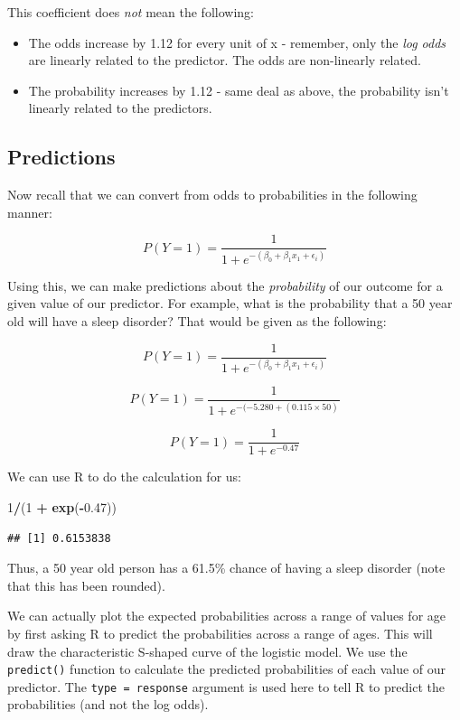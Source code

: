 \documentclass[
]{book}
\newenvironment{Shaded}{\begin{snugshade}}{\end{snugshade}}
\newcommand{\DecValTok}[1]{\textcolor[rgb]{0.00,0.00,0.81}{#1}}
\newcommand{\FloatTok}[1]{\textcolor[rgb]{0.00,0.00,0.81}{#1}}
\newcommand{\FunctionTok}[1]{\textcolor[rgb]{0.13,0.29,0.53}{\textbf{#1}}}
\newcommand{\NormalTok}[1]{#1}
\newcommand{\SpecialCharTok}[1]{\textcolor[rgb]{0.81,0.36,0.00}{\textbf{#1}}}
\providecommand{\tightlist}{%
  \setlength{\itemsep}{0pt}\setlength{\parskip}{0pt}}
\begin{document}
This coefficient does \emph{not} mean the following:

\begin{itemize}
\tightlist
\item
  The odds increase by 1.12 for every unit of x - remember, only the \emph{log odds} are linearly related to the predictor. The odds are non-linearly related.
\item
  The probability increases by 1.12 - same deal as above, the probability isn't linearly related to the predictors.
\end{itemize}

\hypertarget{predictions-1}{%
\subsection{Predictions}\label{predictions-1}}

Now recall that we can convert from odds to probabilities in the following manner:

\[
P(Y = 1) = \frac{1}{1 + e^{-(\beta_0 + \beta_1 x_1 + \epsilon_i)}} 
\]

Using this, we can make predictions about the \emph{probability} of our outcome for a given value of our predictor. For example, what is the probability that a 50 year old will have a sleep disorder? That would be given as the following:

\[
P(Y = 1) = \frac{1}{1 + e^{-(\beta_0 + \beta_1 x_1 + \epsilon_i)}} 
\]

\[
P(Y = 1) = \frac{1}{1 + e^{-(-5.280 + (0.115 \times 50)}} 
\]

\[
P(Y = 1) = \frac{1}{1 + e^{-0.47}} 
\]

We can use R to do the calculation for us:

\begin{Shaded}
\begin{Highlighting}[]
\DecValTok{1}\SpecialCharTok{/}\NormalTok{(}\DecValTok{1} \SpecialCharTok{+} \FunctionTok{exp}\NormalTok{(}\SpecialCharTok{{-}}\FloatTok{0.47}\NormalTok{))}
\end{Highlighting}
\end{Shaded}

\begin{verbatim}
## [1] 0.6153838
\end{verbatim}

Thus, a 50 year old person has a 61.5\% chance of having a sleep disorder (note that this has been rounded).

We can actually plot the expected probabilities across a range of values for age by first asking R to predict the probabilities across a range of ages. This will draw the characteristic S-shaped curve of the logistic model. We use the \texttt{predict()} function to calculate the predicted probabilities of each value of our predictor. The \texttt{type\ =\ response} argument is used here to tell R to predict the probabilities (and not the log odds).
\end{document}
